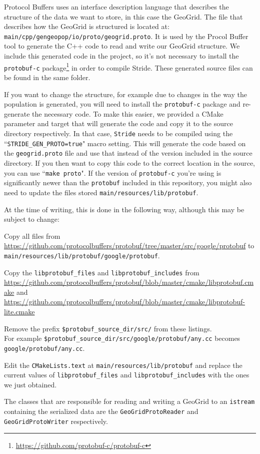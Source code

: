 Protocol Buffers uses an interface description language that describes the structure of the data we want to store, in this case the GeoGrid. The file that describes how the GeoGrid is structured is located at:
\texttt{main/cpp/gengeopop/io/proto/geogrid.proto}. It is used by the Procol Buffer tool to generate the C++ code to read and write our GeoGrid structure. We include this generated code in the project, so it's not necessary to install the \texttt{protobuf-c} package\footnote{\url{https://github.com/protobuf-c/protobuf-c}} in order to compile Stride. These generated source files can be found in the same folder.

If you want to change the structure, for example due to changes in the way the population is generated, you will need to install the \texttt{protobuf-c}  package and re-generate the necessary code. To make this easier, we provided a CMake parameter and target that will generate the code and copy it to the source directory respectively. In that case, \texttt{Stride} needs to be compiled using the ``\texttt{STRIDE\_GEN\_PROTO=true}" macro setting. This will generate the code based on the \texttt{geogrid.proto} file and use that instead of the version included in the source directory. If you then want to copy this code to the correct location in the source, you can use ``\texttt{make proto}". If the version of \texttt{protobuf-c} you're using is significantly newer than the \texttt{protobuf} included in this repository, you might also need to update the files stored \texttt{main/resources/lib/protobuf}.

At the time of writing, this is done in the following way, although this may be subject to change:
\begin{compactitem}
    \item Copy all files from \url{https://github.com/protocolbuffers/protobuf/tree/master/src/google/protobuf} to \texttt{main/resources/lib/protobuf/google/protobuf}.
    \item Copy the \texttt{libprotobuf\_files} and \texttt{libprotobuf\_includes} from \url{https://github.com/protocolbuffers/protobuf/blob/master/cmake/libprotobuf.cmake} and \url{https://github.com/protocolbuffers/protobuf/blob/master/cmake/libprotobuf-lite.cmake}
    \item Remove the prefix \texttt{\${protobuf\_source\_dir}/src/} from these listings.\\
        For example \texttt{\${protobuf\_source\_dir}/src/google/protobuf/any.cc} becomes \texttt{google/protobuf/any.cc}.
    \item Edit the \texttt{CMakeLists.text} at \texttt{main/resources/lib/protobuf} and replace the current values of \texttt{libprotobuf\_files} and \texttt{libprotobuf\_includes} with the ones we just obtained.
\end{compactitem}
The classes that are responsible for reading and writing a GeoGrid to an \texttt{istream} containing the serialized data are the \texttt{GeoGridProtoReader} and \texttt{GeoGridProtoWriter} respectively.
